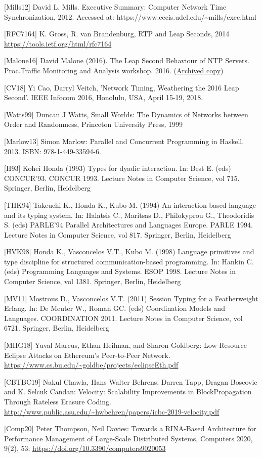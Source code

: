 \documentclass[11pt,a4paper]{article}
\begin{document}
{[}Mills12{]} David L. Mills. Executive Summary: Computer Network Time
Synchronization, 2012. Accessed at:
https://www.eecis.udel.edu/\textasciitilde{}mills/exec.html

{[}RFC7164{]} K. Gross, R. van Brandenburg, RTP and Leap Seconds, 2014
\href{https://tools.ietf.org/html/rfc7164}{{https://tools.ietf.org/html/rfc7164}}

{[}Malone16{]} David Malone (2016). The Leap Second Behaviour of NTP
Servers. Proc.Traffic Monitoring and Analysis workshop. 2016.
(\href{https://web.archive.org/web/20161023201948/http://tma.ifip.org/2016/papers/tma2016-final27.pdf}{{Archived
copy}})

{[}CV18{]} Yi Cao, Darryl Veitch, 'Network Timing, Weathering the 2016
Leap Second'. IEEE Infocom 2016, Honolulu, USA, April 15-19, 2018.

{[}Watts99{]} Duncan J Watts, Small Worlds: The Dynamics of Networks
between Order and Randomness, Princeton University Press, 1999

{[}Marlow13{]} Simon Marlow: Parallel and Concurrent Programming in
Haskell. 2013. ISBN: 978-1-449-33594-6.

{[}H93{]} Kohei Honda (1993) Types for dyadic interaction. In: Best E.
(eds) CONCUR'93. CONCUR 1993. Lecture Notes in Computer Science, vol
715. Springer, Berlin, Heidelberg

{[}THK94{]} Takeuchi K., Honda K., Kubo M. (1994) An interaction-based
language and its typing system. In: Halatsis C., Maritsas D.,
Philokyprou G., Theodoridis S. (eds) PARLE'94 Parallel Architectures and
Languages Europe. PARLE 1994. Lecture Notes in Computer Science, vol
817. Springer, Berlin, Heidelberg

{[}HVK98{]} Honda K., Vasconcelos V.T., Kubo M. (1998) Language
primitives and type discipline for structured communication-based
programming. In: Hankin C. (eds) Programming Languages and Systems. ESOP
1998. Lecture Notes in Computer Science, vol 1381. Springer, Berlin,
Heidelberg

{[}MV11{]} Mostrous D., Vasconcelos V.T. (2011) Session Typing for a
Featherweight Erlang. In: De Meuter W., Roman GC. (eds) Coordination
Models and Languages. COORDINATION 2011. Lecture Notes in Computer
Science, vol 6721. Springer, Berlin, Heidelberg

{[}MHG18{]} Yuval Marcus, Ethan Heilman, and Sharon Goldberg:
Low-Resource Eclipse Attacks on Ethereum's Peer-to-Peer Network.
\href{https://www.cs.bu.edu/~goldbe/projects/eclipseEth.pdf}{{https://www.cs.bu.edu/\textasciitilde{}goldbe/projects/eclipseEth.pdf}}

{[}CBTBC19{]} Nakul Chawla, Hans Walter Behrens, Darren Tapp, Dragan
Boscovic and K. Selcuk Candan: Velocity: Scalability Improvements in
BlockPropagation Through Rateless Erasure Coding.
\href{http://www.public.asu.edu/~hwbehren/papers/icbc-2019-velocity.pdf}{{http://www.public.asu.edu/\textasciitilde{}hwbehren/papers/icbc-2019-velocity.pdf}}

{[}Comp20{]} Peter Thompson, Neil Davies: Towards a RINA-Based
Architecture for Performance Management of Large-Scale Distributed
Systems, Computers 2020, 9(2), 53;
\href{https://doi.org/10.3390/computers9020053}{{https://doi.org/10.3390/computers9020053}}
\end{document}
